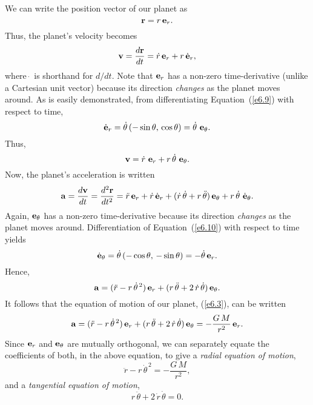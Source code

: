 We can  write the position vector of our planet as
\begin{equation}
{\bf r} = r\,{\bf e}_r.
\end{equation}
Thus, the planet's velocity becomes
\begin{equation}\label{e6.12}
{\bf v} = \frac{d{\bf r}}{dt} = \dot{r}\,{\bf e}_r + r\,\dot{\bf e}_r,
\end{equation}
where $\dot{~}$ is shorthand for $d/dt$. Note that ${\bf e}_r$
has a non-zero time-derivative (unlike a Cartesian unit vector) because its
direction {\em changes}\/ as the planet moves around. As is easily demonstrated,
from differentiating Equation~(\ref{e6.9}) with respect to time, 
\begin{equation}
\dot{\bf e}_r = \dot{\theta}\,(-\sin\theta,\,\cos\theta) = \dot{\theta}\,\,{\bf e}_\theta.
\end{equation}
Thus,
\begin{equation}\label{e6.14}
{\bf v} = \dot{r}\,\,{\bf e}_r + r\,\dot{\theta}\,\,{\bf e}_\theta.
\end{equation}
Now, the planet's acceleration is written
\begin{equation}
{\bf a} = \frac{d{\bf v}}{dt} = \frac{d^2{\bf r}}{dt^2}= \ddot{r}\,{\bf e}_r + \dot{r}\,\dot{\bf e}_r+(\dot{r}\,\dot{\theta}
+ r\,\ddot{\theta})\,{\bf e}_\theta + r\,\dot{\theta}\,\,\dot{\bf e}_\theta.
\end{equation}
Again, ${\bf e}_\theta$
has a non-zero time-derivative because its
direction {\em changes}\/ as the planet moves around. 
Differentiation of Equation~(\ref{e6.10}) with respect to time yields
\begin{equation}
\dot{\bf e}_\theta = \dot{\theta}\,(-\cos\theta,\,-\sin\theta) = - \dot{\theta}\,{\bf e}_r.
\end{equation}
Hence,
\begin{equation}
{\bf a} = (\ddot{r}-r\,\dot{\theta}^{\,2})\,{\bf e}_r + (r\,\ddot{\theta} + 2\,\dot{r}\,\dot{\theta})\,{\bf e}_\theta.
\end{equation}
It follows that the equation of motion of our planet, (\ref{e6.3}), can be written
\begin{equation}
{\bf a} =  (\ddot{r}-r\,\dot{\theta}^{\,2})\,{\bf e}_r + (r\,\ddot{\theta} + 2\,\dot{r}\,\dot{\theta})\,{\bf e}_\theta = - \frac{G\,M}{r^2}\,{\bf e}_r.
\end{equation}
Since ${\bf e}_r$ and ${\bf e}_\theta$ are mutually orthogonal, we can separately equate the coefficients of both, in the above equation, to give
a {\em radial equation of motion}, 
\begin{equation}\label{e6.19}
\ddot{r}-r\,\dot{\theta}^{\,2} = - \frac{G\,M}{r^2},
\end{equation}
and a {\em tangential equation of motion},
\begin{equation}\label{e6.20}
r\,\ddot{\theta} + 2\,\dot{r}\,\dot{\theta} = 0.
\end{equation}


